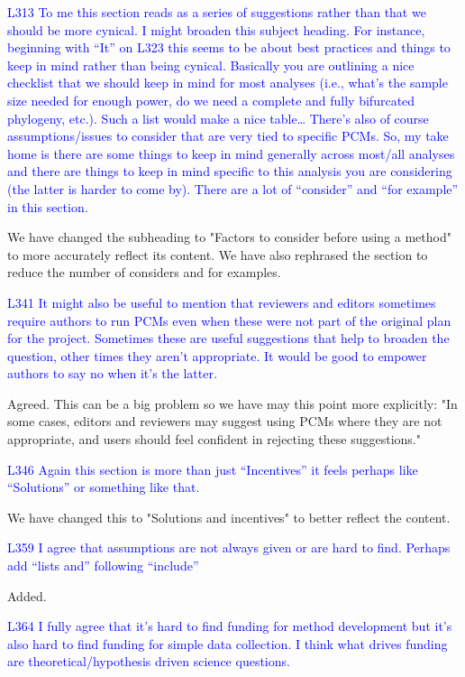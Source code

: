 \documentclass[12pt]{letter}
\begin{document}
\begin{letter}{}
\textcolor{blue}{L313 To me this section reads as a series of suggestions rather than that we should be more cynical. I might broaden this subject heading. For instance, beginning with “It” on L323 this seems to be about best practices and things to keep in mind rather than being cynical. Basically you are outlining a nice checklist that we should keep in mind for most analyses (i.e., what's the sample size needed for enough power, do we need a complete and fully bifurcated phylogeny, etc.). Such a list would make a nice table… There's also of course assumptions/issues to consider that are very tied to specific PCMs. So, my take home is there are some things to keep in mind generally across most/all analyses and there are things to keep in mind specific to this analysis you are considering (the latter is harder to come by). There are a lot of “consider” and “for example” in this section.}

We have changed the subheading to "Factors to consider before using a method" to more accurately reflect its content. We have also rephrased the section to reduce the number of considers and for examples. 

\textcolor{blue}{L341 It might also be useful to mention that reviewers and editors sometimes require authors to run PCMs even when these were not part of the original plan for the project. Sometimes these are useful suggestions that help to broaden the question, other times they aren't appropriate. It would be good to empower authors to say no when it's the latter.}

Agreed. This can be a big problem so we have may this point more explicitly: "In some cases, editors and reviewers may suggest using PCMs where they are not appropriate, and users should feel confident in rejecting these suggestions."

\textcolor{blue}{L346 Again this section is more than just “Incentives” it feels perhaps like “Solutions” or something like that.}

We have changed this to "Solutions and incentives" to better reflect the content.

\textcolor{blue}{L359 I agree that assumptions are not always given or are hard to find. Perhaps add “lists and” following “include”}

Added.

\textcolor{blue}{L364 I fully agree that it's hard to find funding for method development but it's also hard to find funding for simple data collection. I think what drives funding are theoretical/hypothesis driven science questions.}


\end{letter}
\end{document}

